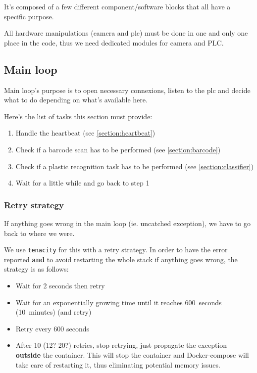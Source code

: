 It's composed of a few different component/software blocks that all have a specific purpose.

All hardware manipulations (camera and \gls{plc}) must be done in one and only one place in the code,
thus we need dedicated modules for camera and PLC.


\subsection{Main loop}

Main loop's purpose is to open necessary connexions, listen to the \gls{plc} and decide what to do depending on what's available here.

Here's the list of tasks this section must provide:

\begin{enumerate}
    \item Handle the \gls{heartbeat} (see \ref{section:heartbeat})
    \item Check if a barcode scan has to be performed (see \ref{section:barcode})
    \item Check if a plastic recognition task has to be performed (see \ref{section:classifier})
    \item Wait for a little while and go back to step 1
\end{enumerate}

\subsubsection{Retry strategy}

If anything goes wrong in the main loop (ie. uncatched exception), we have to go back to where we were.

We use \texttt{tenacity} for this with a retry strategy. In order to have the error reported \textbf{and}
to avoid restarting the whole stack if anything goes wrong, the strategy is as follows:

\begin{itemize}
    \item Wait for 2 seconds then retry
    \item Wait for an exponentially growing time until it reaches 600~seconds (10~minutes) (and retry)
    \item Retry every 600 seconds
    \item After 10 (12? 20?) retries, stop retrying, just propagate the exception \textbf{outside} the container.
        This will stop the container and Docker-compose will take care of restarting it, thus eliminating
        potential memory issues.
\end{itemize}


